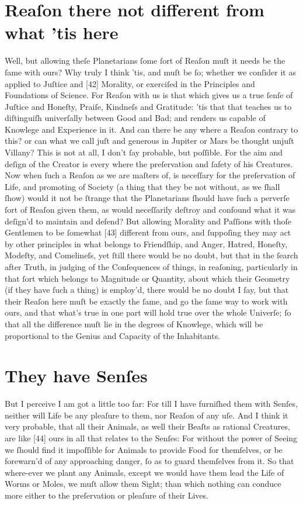 \documentclass[letterpaper]{book}
\begin{document}
\section{Reaſon there not different from what 'tis here}

Well, but allowing theſe Planetarians ſome ſort of Reaſon muſt it needs
be the ſame with ours? Why truly I think 'tis, and muſt be ſo; whether
we conſider it as applied to Juſtice and [42] Morality, or exerciſed in the
Principles and Foundations of Science. For Reaſon with us is that which
gives us a true ſenſe of Juſtice and Honeſty, Praiſe, Kindneſs and Gratitude:
'tis that that teaches us to diſtinguiſh univerſally between Good and Bad;
and renders us capable of Knowlege and Experience in it. And can there be
any where a Reaſon contrary to this? or can what we call juſt and generous
in Jupiter or Mars be thought unjuſt Villany? This is not at all, I don't ſay
probable, but poſſible. For the aim and deſign of the Creator is every where
the preſervation and ſafety of his Creatures. Now when ſuch a Reaſon as
we are maſters of, is neceſſary for the preſervation of Life, and promoting
of Society (a thing that they be not without, as we ſhall ſhow) would it not
be ſtrange that the Planetarians ſhould have ſuch a perverſe ſort of Reaſon
given them, as would neceſſarily deſtroy and confound what it was deſign'd
to maintain and defend? But allowing Morality and Paſſions with thoſe
Gentlemen to be ſomewhat [43] different from ours, and ſuppoſing they may
act by other principles in what belongs to Friendſhip, and Anger, Hatred,
Honeſty, Modeſty, and Comelineſs, yet ſtill there would be no doubt, but
that in the ſearch after Truth, in judging of the Conſequences of things, in
reaſoning, particularly in that ſort which belongs to Magnitude or Quantity,
about which their Geometry (if they have ſuch a thing) is employ'd, there
would be no doubt I ſay, but that their Reaſon here muſt be exactly the
ſame, and go the ſame way to work with ours, and that what's true in one
part will hold true over the whole Univerſe; ſo that all the difference muſt
lie in the degrees of Knowlege, which will be proportional to the Genius and
Capacity of the Inhabitants.


\section{They have Senſes}

But I perceive I am got a little too far: For till I have furniſhed them with
Senſes, neither will Life be any pleaſure to them, nor Reaſon of any uſe.
And I think it very probable, that all their Animals, as well their Beaſts as
rational Creatures, are like [44] ours in all that relates to the Senſes: For
without the power of Seeing we ſhould find it impoſſible for Animals to
provide Food for themſelves, or be forewarn'd of any approaching danger,
ſo as to guard themſelves from it. So that where-ever we plant any Animals,
except we would have them lead the Life of Worms or Moles, we muſt allow
them Sight; than which nothing can conduce more either to the preſervation
or pleaſure of their Lives.
\end{document}

